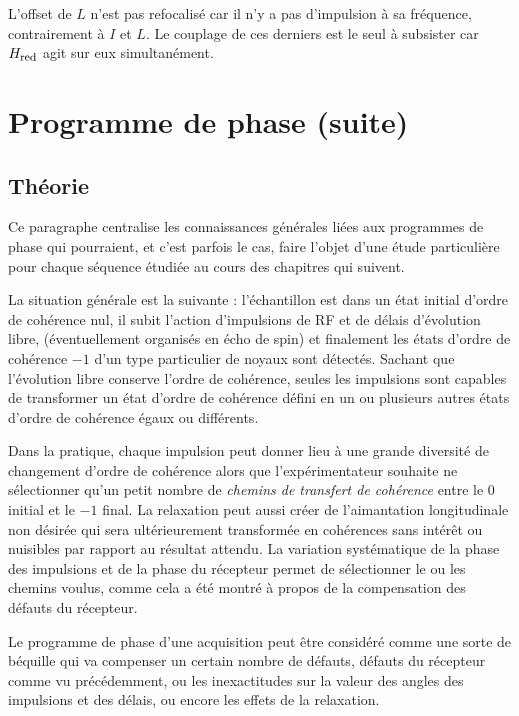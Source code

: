 L'offset de $L$ n'est pas refocalisé car il n'y a pas 
d'impulsion à sa fréquence, contrairement à $I$ et $L$.
Le couplage de ces derniers est le seul à subsister car $H_{\mbox{\footnotesize{red}}}$ agit
sur eux simultanément.

\section{Programme de phase (suite)}
\subsection{Théorie}

Ce paragraphe centralise les connaissances générales liées aux programmes de phase
qui pourraient, et c'est parfois le cas, faire l'objet d'une étude
particulière pour chaque séquence étudiée au cours des chapitres qui suivent.

La situation générale est la suivante : l'échantillon est dans un état
initial d'ordre de cohérence nul, il subit l'action d'impulsions de RF
et de délais d'évolution libre, (éventuellement organisés en écho de spin) et
finalement les états d'ordre de cohérence $-1$ d'un type particulier de noyaux
sont détectés. 
Sachant que l'évolution libre conserve l'ordre de cohérence,
seules les impulsions sont capables de transformer un état d'ordre de cohérence
défini en un ou plusieurs autres états d'ordre de cohérence égaux ou différents.

Dans la pratique, chaque impulsion peut donner lieu à une grande
diversité de changement d'ordre de cohérence alors que l'expérimentateur
souhaite ne sélectionner qu'un petit nombre de
\emph{chemins de transfert de cohérence} entre le 0 initial et le $-1$ final.
La relaxation peut aussi créer de l'aimantation longitudinale
non désirée qui sera ultérieurement transformée en cohérences
sans intérêt ou nuisibles par rapport au résultat attendu.
La variation systématique de la phase des impulsions et de la phase
du récepteur permet de sélectionner le ou les chemins voulus, comme
cela a été montré à propos de la compensation des défauts du récepteur.

Le programme de phase d'une acquisition peut être considéré comme une sorte de béquille
qui va compenser un certain nombre de défauts, 
défauts du récepteur comme vu précédemment,
ou les inexactitudes sur la valeur des angles des impulsions et des délais,
ou encore les effets de la relaxation.

